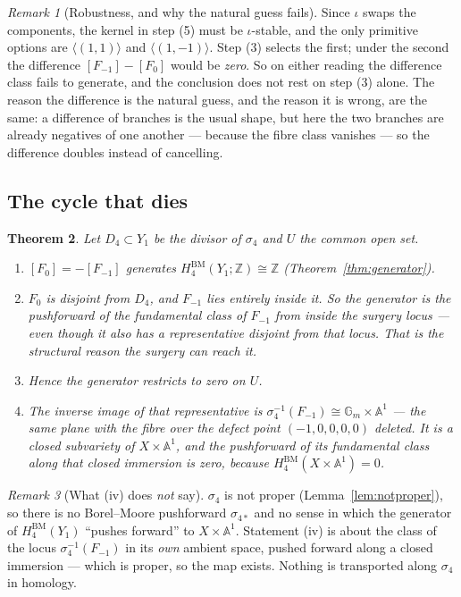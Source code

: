 \documentclass[11pt]{article}
\newtheorem{theorem}{Theorem}[section]
\theoremstyle{definition}
\theoremstyle{remark}
\newtheorem{remark}[theorem]{Remark}
\newcommand{\Z}{\mathbb{Z}}
\newcommand{\Aff}[1]{\mathbb{A}^{#1}}
\newcommand{\Gm}{\mathbb{G}_m}
\newcommand{\HBM}[1]{H^{\mathrm{BM}}_{#1}}
\begin{document}
\begin{remark}[Robustness, and why the natural guess
fails]\label{rem:robust}
Since $\iota$ swaps the components, the kernel in step (5) must be
$\iota$-stable, and the only primitive options are $\langle(1,1)\rangle$ and
$\langle(1,-1)\rangle$. Step (3) selects the first; under the second the
difference $[F_{-1}]-[F_0]$ would be \emph{zero}. So on either reading the
difference class fails to generate, and the conclusion does not rest on step
(3) alone. The reason the difference is the natural guess, and the reason it is
wrong, are the same: a difference of branches is the usual shape, but here the
two branches are already negatives of one another --- because the fibre class
vanishes --- so the difference doubles instead of cancelling.
\end{remark}

\subsection{The cycle that dies}

\begin{theorem}\label{thm:dies}
Let $D_4\subset Y_1$ be the divisor of $\sigma_4$ and $U$ the common open set.
\begin{enumerate}
\item[(i)] $[F_0]=-[F_{-1}]$ generates $\HBM{4}(Y_1;\Z)\cong\Z$
(Theorem~\ref{thm:generator}).
\item[(ii)] $F_0$ is \emph{disjoint} from $D_4$, and $F_{-1}$ lies
\emph{entirely inside} it. So the generator is the pushforward of the
fundamental class of $F_{-1}$ from inside the surgery locus --- even though it
also has a representative disjoint from that locus. That is the structural
reason the surgery can reach it.
\item[(iii)] Hence the generator restricts to \emph{zero} on $U$.
\item[(iv)] The inverse image of that representative is
$\sigma_4^{-1}(F_{-1})\cong\Gm\times\Aff{1}$ --- the same plane with the fibre
over the defect point $(-1,0,0,0,0)$ deleted. It is a closed subvariety of
$X\times\Aff{1}$, and the pushforward of its fundamental class along that
closed immersion is zero, because $\HBM{4}(X\times\Aff{1})=0$.
\end{enumerate}
\end{theorem}

\begin{remark}[What (iv) does \emph{not} say]\label{rem:notproper}
$\sigma_4$ is not proper (Lemma~\ref{lem:notproper}), so there is no
Borel--Moore pushforward $\sigma_{4*}$ and no sense in which the generator of
$\HBM{4}(Y_1)$ ``pushes forward'' to $X\times\Aff{1}$. Statement (iv) is about
the class of the locus $\sigma_4^{-1}(F_{-1})$ in its \emph{own} ambient
space, pushed forward along a closed immersion --- which is proper, so the map
exists. Nothing is transported along $\sigma_4$ in homology.
\end{remark}
\end{document}
